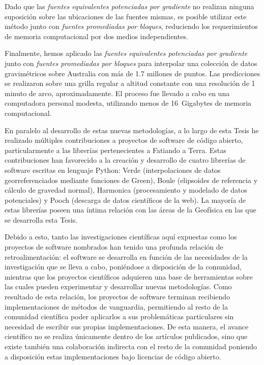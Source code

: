 Dado que las \emph{fuentes equivalentes potenciadas por gradiente} no realizan
ninguna suposición sobre las ubicaciones de las fuentes mismas, es posible
utilizar este método junto con \emph{fuentes promediadas por bloques},
reduciendo los requerimientos de memoria computacional por dos medios
independientes.

Finalmente, hemos aplicado las \emph{fuentes equivalentes potenciadas por
gradiente} junto con \emph{fuentes promediadas por bloques} para interpolar una
colección de datos gravimétricos sobre Australia con más de 1.7 millones de
puntos.
Las predicciones se realizaron sobre una grilla regular a altitud constante con
una resolución de 1 minuto de arco, aproximadamente.
El proceso fue llevado a cabo en una computadora personal modesta, utilizando
menos de 16~Gigabytes de memoria computacional.

\vspace{1em}

En paralelo al desarrollo de estas nuevas metodologías, a lo largo de esta
Tesis he realizado múltiples contribuciones a proyectos de software de código
abierto, particularmente a las librerías pertenecientes a Fatiando a Terra.
Estas contribuciones han favorecido a la creación y desarrollo de cuatro
librerías de software escritas en lenguaje Python: Verde (interpolaciones de
datos georreferenciados mediante funciones de Green), Boule (elipsoides de
referencia y cálculo de gravedad normal), Harmonica (procesamiento y modelado
de datos potenciales) y Pooch (descarga de datos científicos de la web).
La mayoría de estas librerías poseen una íntima relación con las áreas de la
Geofísica en las que se desarrolla esta Tesis.

Debido a esto, tanto las investigaciones científicas aquí expuestas como los
proyectos de software nombrados han tenido una profunda relación de
retroalimentación: el software se desarrolla en función de las necesidades de
la investigación que se lleva a cabo, poniéndose a disposición de la comunidad,
mientras que los proyectos científicos adquieren una base de herramientas
sobre las cuales pueden experimentar y desarrollar nuevas metodologías.
Como resultado de esta relación, los proyectos de software terminan recibiendo
implementaciones de métodos de vanguardia, permitiendo al resto de la comunidad
científica poder aplicarlos a sus problemáticas particulares sin necesidad de
escribir sus propias implementaciones.
De esta manera, el avance científico no se realiza únicamente dentro de los
artículos publicados, sino que existe también una colaboración indirecta con el
resto de la comunidad poniendo a disposición estas implementaciones bajo
licencias de código abierto.

